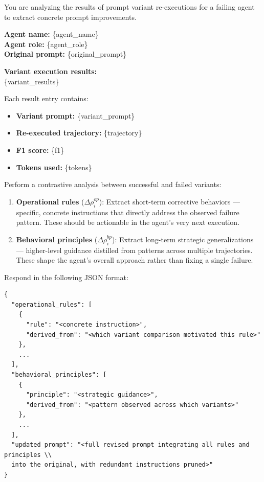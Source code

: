 \begin{tcolorbox}[
    colback=promptbg!100!white,
    sharp corners=south, 
    boxrule=0.25mm, 
    fonttitle=\bfseries, 
    title={\textbf{RoPE: contrastive analysis}}, 
    width=\textwidth, 
    enhanced,
    drop shadow
    ]

You are analyzing the results of prompt variant re-executions for a failing agent to extract concrete prompt improvements.

\textbf{Agent name:} \{agent\_name\} \\
\textbf{Agent role:} \{agent\_role\} \\
\textbf{Original prompt:} \{original\_prompt\}

\textbf{Variant execution results:} \\
\{variant\_results\}

Each result entry contains:
\begin{itemize}
  \item \textbf{Variant prompt:} \{variant\_prompt\}
  \item \textbf{Re-executed trajectory:} \{trajectory\}
  \item \textbf{F1 score:} \{f1\}
  \item \textbf{Tokens used:} \{tokens\}
\end{itemize}

Perform a contrastive analysis between successful and failed variants:

\begin{enumerate}
  \item \textbf{Operational rules} ($\Delta \rho_i^{op}$): Extract short-term corrective behaviors — specific, concrete instructions that directly address the observed failure pattern. These should be actionable in the agent's very next execution. \\

  \item \textbf{Behavioral principles} ($\Delta \rho_i^{bp}$): Extract long-term strategic generalizations — higher-level guidance distilled from patterns across multiple trajectories. These shape the agent's overall approach rather than fixing a single failure. \\

\end{enumerate}
Respond in the following JSON format:
\begin{verbatim}
{
  "operational_rules": [
    {
      "rule": "<concrete instruction>",
      "derived_from": "<which variant comparison motivated this rule>"
    },
    ...
  ],
  "behavioral_principles": [
    {
      "principle": "<strategic guidance>",
      "derived_from": "<pattern observed across which variants>"
    },
    ...
  ],
  "updated_prompt": "<full revised prompt integrating all rules and principles \\ 
  into the original, with redundant instructions pruned>"
}
\end{verbatim}
\end{tcolorbox}